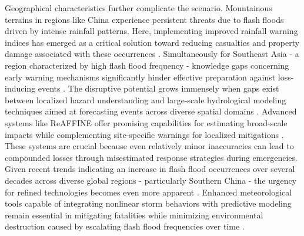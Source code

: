 Geographical characteristics further complicate the scenario. Mountainous terrains in regions like China experience persistent threats due to flash floods driven by intense rainfall patterns. Here, implementing improved rainfall warning indices has emerged as a critical solution toward reducing casualties and property damage associated with these occurrences \citep{Yuan2019}. Simultaneously for Southeast Asia - a region characterized by high flash flood frequency - knowledge gaps concerning early warning mechanisms significantly hinder effective preparation against loss-inducing events \citep{AlRawas2024}.
The disruptive potential grows immensely when gaps exist between localized hazard understanding and large-scale hydrological modeling techniques aimed at forecasting events across diverse spatial domains \citep{Ritter2021a}\citep{Ritter2021b}. Advanced systems like ReAFFINE offer promising capabilities for estimating broad-scale impacts while complementing site-specific warnings for localized mitigations \citep{Ritter2021a}. These systems are crucial because even relatively minor inaccuracies can lead to compounded losses through misestimated response strategies during emergencies.
Given recent trends indicating an increase in flash flood occurrences over several decades across diverse global regions - particularly Southern China - the urgency for refined technologies becomes even more apparent \citep{Zhang2022}. Enhanced meteorological tools capable of integrating nonlinear storm behaviors with predictive modeling remain essential in mitigating fatalities while minimizing environmental destruction caused by escalating flash flood frequencies over time \citep{Yang2022}\citep{Zhang2022}.
